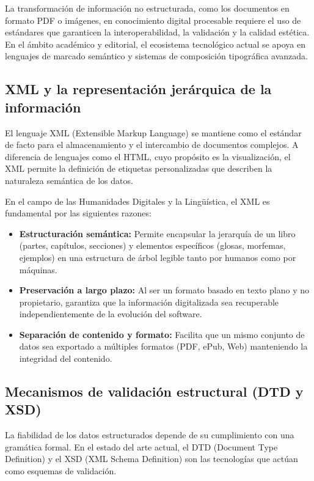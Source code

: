 La transformación de información no estructurada, como los documentos en formato PDF o imágenes, en conocimiento digital procesable requiere el uso de estándares que garanticen la interoperabilidad, la validación y la calidad estética. En el ámbito académico y editorial, el ecosistema tecnológico actual se apoya en lenguajes de marcado semántico y sistemas de composición tipográfica avanzada.

\subsection{XML y la representación jerárquica de la información}

El lenguaje XML (Extensible Markup Language) se mantiene como el estándar de facto para el almacenamiento y el intercambio de documentos complejos. A diferencia de lenguajes como el HTML, cuyo propósito es la visualización, el XML permite la definición de etiquetas personalizadas que describen la naturaleza semántica de los datos.

En el campo de las Humanidades Digitales y la Lingüística, el XML es fundamental por las siguientes razones:

\begin{itemize}
    \item \textbf{Estructuración semántica:} Permite encapsular la jerarquía de un libro (partes, capítulos, secciones) y elementos específicos (glosas, morfemas, ejemplos) en una estructura de árbol legible tanto por humanos como por máquinas.
    
    \item \textbf{Preservación a largo plazo:} Al ser un formato basado en texto plano y no propietario, garantiza que la información digitalizada sea recuperable independientemente de la evolución del software.
    
    \item \textbf{Separación de contenido y formato:} Facilita que un mismo conjunto de datos sea exportado a múltiples formatos (PDF, ePub, Web) manteniendo la integridad del contenido.
\end{itemize}

\subsection{Mecanismos de validación estructural (DTD y XSD)}

La fiabilidad de los datos estructurados depende de su cumplimiento con una gramática formal. En el estado del arte actual, el DTD (Document Type Definition) y el XSD (XML Schema Definition) son las tecnologías que actúan como esquemas de validación.

